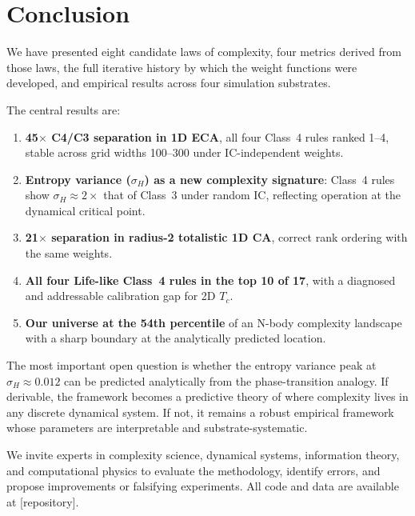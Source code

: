 \documentclass[12pt,a4paper]{article}
\begin{document}
\section{Conclusion}

We have presented eight candidate laws of complexity, four metrics derived
from those laws, the full iterative history by which the weight functions were
developed, and empirical results across four simulation substrates.

The central results are:
\begin{enumerate}[noitemsep]
  \item \textbf{45$\times$ C4/C3 separation in 1D ECA}, all four Class~4 rules
    ranked 1--4, stable across grid widths 100--300 under IC-independent weights.
  \item \textbf{Entropy variance ($\sigma_H$) as a new complexity signature}:
    Class~4 rules show $\sigma_H \approx 2\times$ that of Class~3 under random IC,
    reflecting operation at the dynamical critical point.
  \item \textbf{21$\times$ separation in radius-2 totalistic 1D CA},
    correct rank ordering with the same weights.
  \item \textbf{All four Life-like Class~4 rules in the top 10 of 17},
    with a diagnosed and addressable calibration gap for 2D $T_c$.
  \item \textbf{Our universe at the 54th percentile} of an N-body complexity
    landscape with a sharp boundary at the analytically predicted location.
\end{enumerate}

The most important open question is whether the entropy variance peak at
$\sigma_H \approx 0.012$ can be predicted analytically from the phase-transition
analogy.
If derivable, the framework becomes a predictive theory of where complexity
lives in any discrete dynamical system.
If not, it remains a robust empirical framework whose parameters are
interpretable and substrate-systematic.

We invite experts in complexity science, dynamical systems, information theory,
and computational physics to evaluate the methodology, identify errors,
and propose improvements or falsifying experiments.
All code and data are available at [repository].

\end{document}
